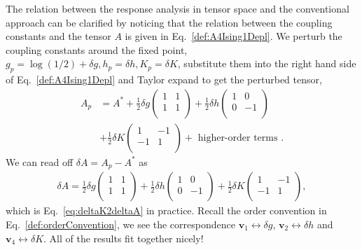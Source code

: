 \documentclass[aps,prb,reprint,superscriptaddress,floatfix]{revtex4-2}
\begin{document}
The relation between the response analysis in tensor space and the
conventional approach can be clarified by noticing that the relation between
the coupling constants and the tensor $A$ is given in
Eq.~\eqref{def:A4Ising1Depl}. We perturb the coupling constants around
the fixed point, $g_p = \log{(1/2)} + \delta g, h_p = \delta h, K_p =
\delta K$, substitute them into the right hand side of
Eq.~\eqref{def:A4Ising1Depl} and Taylor expand to get the perturbed
tensor,
%
\begin{align}\label{eq:Apert4Ising1D}
    A_p &= A^* + \frac{1}{2} \delta g
    \begin{pmatrix}
    1 & 1 \\
    1 & 1 \\
    \end{pmatrix}
    + \frac{1}{2} \delta h
    \begin{pmatrix}
    1 & 0 \\
    0 & -1 \\
    \end{pmatrix} \nonumber\\
    &+ \frac{1}{2} \delta K
    \begin{pmatrix}
    1 & -1 \\
    -1 & 1 \\
    \end{pmatrix}
    + \text{ higher-order terms }.
\end{align}
%
We can read off $\delta A = A_p - A^*$ as
%
\begin{align}\label{eq:deltaA4Ising1D}
    \delta A = \frac{1}{2} \delta g
    \begin{pmatrix}
    1 & 1 \\
    1 & 1 \\
    \end{pmatrix}
    + \frac{1}{2} \delta h
    \begin{pmatrix}
    1 & 0 \\
    0 & -1 \\
    \end{pmatrix} 
    + \frac{1}{2} \delta K
    \begin{pmatrix}
    1 & -1 \\
    -1 & 1 \\
    \end{pmatrix},
\end{align}
%
which is Eq.~\eqref{eq:deltaK2deltaA} in practice. Recall the order
convention in Eq.~\eqref{def:orderConvention}, we see the correspondence
$\mathbf{v}_1 \leftrightarrow \delta g$, $\mathbf{v}_2 \leftrightarrow
\delta h$ and $\mathbf{v}_4 \leftrightarrow \delta K$. All of the
results fit together nicely! 
%
\end{document}
